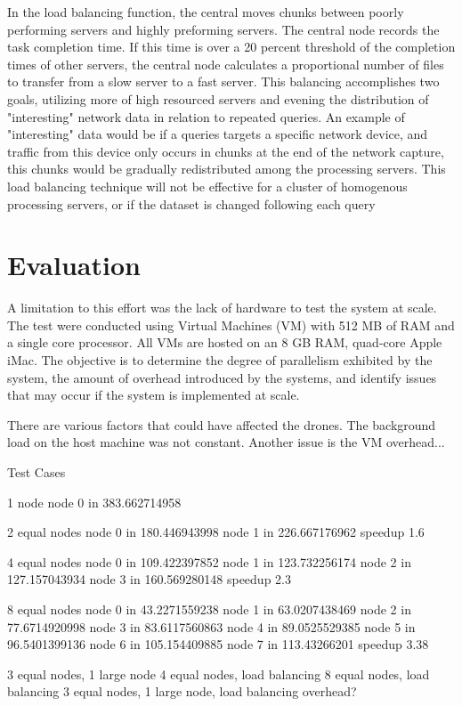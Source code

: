 \documentclass{article}
\begin{document}
\begin{multicols}{2}
In the load balancing function, the central moves chunks between poorly performing servers and highly preforming servers.  The central node records the task completion time.  If this time is over a 20 percent threshold of the completion times of other servers, the central node calculates a proportional number of files to transfer from a slow server to a fast server.  This balancing accomplishes two goals, utilizing more of high resourced servers and evening the distribution of "interesting" network data in relation to repeated queries.  An example of "interesting" data would be if a queries targets a specific network device, and traffic from this device only occurs in chunks at the end of the network capture, this chunks would be gradually redistributed among the processing servers.  This load balancing technique will not be effective for a cluster of homogenous processing servers, or if the dataset is changed following each query

\section{Evaluation} 

A limitation to this effort was the lack of hardware to test the system at scale. The test were conducted using Virtual Machines (VM) with 512 MB of RAM and a single core processor.  All VMs are hosted on an 8 GB RAM, quad-core Apple iMac.   The objective is to determine the degree of parallelism exhibited by the system, the amount of overhead introduced by the systems, and identify issues that may occur if the system is implemented at scale.

There are various factors that could have affected the drones.  The background load on the host machine was not constant. Another issue is the VM overhead...

Test Cases

1 node
node 0 in 383.662714958

2 equal nodes
node 0 in 180.446943998
node 1 in 226.667176962
speedup 1.6

4 equal nodes
node 0 in 109.422397852
node 1 in 123.732256174
node 2 in 127.157043934
node 3 in 160.569280148
speedup 2.3

8 equal nodes
node 0 in 43.2271559238
node 1 in 63.0207438469
node 2 in 77.6714920998
node 3 in 83.6117560863
node 4 in 89.0525529385
node 5 in 96.5401399136
node 6 in 105.154409885
node 7 in 113.43266201
speedup 3.38


3 equal nodes, 1 large node
4 equal nodes, load balancing
8 equal nodes, load balancing
3 equal nodes, 1 large node, load balancing
overhead?


\end{multicols}
\end{document}
